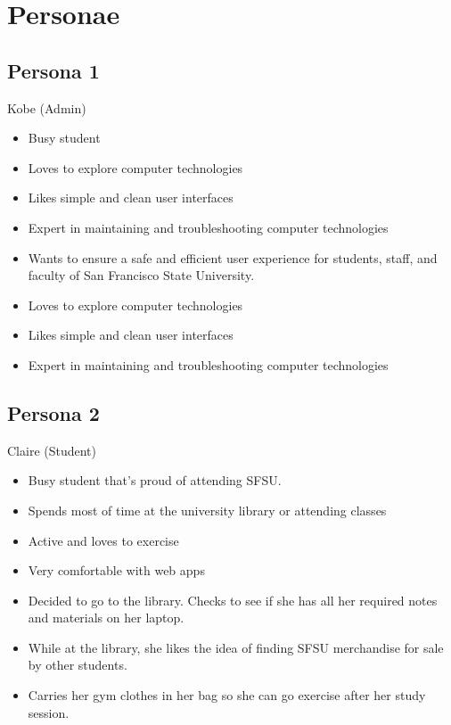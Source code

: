 \section{Personae}
\subsection{Persona 1}
\begin{description}[font=\bfseries\itshape]
\item[Actor:]Kobe (Admin)
\item[About:]\hfill
\begin{itemize}[leftmargin=0mm]
\item Busy student
\item Loves to explore computer technologies
\item Likes simple and clean user interfaces
\item Expert in maintaining and troubleshooting computer technologies
\end{itemize}
\item[Goals \& Scenario:]\hfill
\begin{itemize}[leftmargin=0mm]
\item Wants to ensure a safe and efficient user experience for students, staff, and faculty of San Francisco State University.
\item Loves to explore computer technologies
\item Likes simple and clean user interfaces
\item Expert in maintaining and troubleshooting computer technologies
\end{itemize}
\end{description}

\subsection{Persona 2}
\begin{description}[font=\bfseries\itshape]
\item[Actor:]Claire (Student)
\item[About:]\hfill
\begin{itemize}[leftmargin=0mm]
\item Busy student that's proud of attending SFSU.
\item Spends most of time at the university library or attending classes
\item Active and loves to exercise
\item Very comfortable with web apps
\end{itemize}
\item[Goals \& Scenario:]\hfill
\begin{itemize}[leftmargin=0mm]
\item Decided to go to the library. Checks to see if she has all her required notes and materials on her laptop.
\item While at the library, she likes the idea of finding SFSU merchandise for sale by other students.
\item Carries her gym clothes in her bag so she can go exercise after her study session.
\end{itemize}
\end{description}

